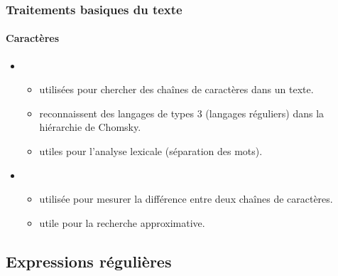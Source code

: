 \documentclass[xcolor=table]{beamer}
\begin{document}
\begin{frame}
\frametitle{Traitements basiques du texte}
\framesubtitle{Caractères}

\begin{itemize}
	\item {}
	\begin{itemize}
		\item utilisées pour chercher des chaînes de caractères dans un texte.
		\item reconnaissent des langages de types 3 (langages réguliers) dans la hiérarchie de Chomsky. 
		\item utiles pour l'analyse lexicale (séparation des mots).
	\end{itemize}
	\item {}
	\begin{itemize}
		\item utilisée pour mesurer la différence entre deux chaînes de caractères.
		\item utile pour la recherche approximative.
	\end{itemize}
\end{itemize}

\end{frame}

\subsection{Expressions régulières}
\end{document}
